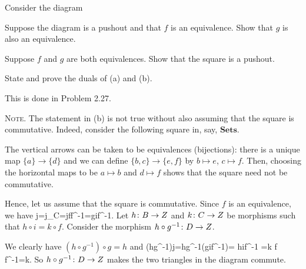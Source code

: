 \bp
Consider the diagram
\bse
{}
\ese
\ben[label=(\alph*)]
\item Suppose the diagram is a pushout and that $f$ is an equivalence. Show that $g$ is also an equivalence.
\item Suppose $f$ and $g$ are both equivalences. Show that the square is a pushout.
\item State and prove the duals of (a) and (b).
\een
\ep

\bs
\ben[label=(\alph*)]
\item This is done in Problem 2.27.
\item {\scshape Note}. The statement in (b) is not true without also assuming that the square is commutative. Indeed, consider the following square in, say, $\mathbf{Sets}$.
\bse
{}
\ese
The vertical arrows can be taken to be equivalences (bijections): there is a unique map $\{a\}\to\{d\}$ and we can define $\{b,c\}\to\{e,f\}$ by $b\mapsto e$, $c\mapsto f$. Then, choosing the horizontal maps to be $a\mapsto b$ and $d\mapsto f$ shows that the square need not be commutative.

Hence, let us assume that the square is commutative. Since $f$ is an equivalence, we have
\bse
j=j\circ \id_C=j\circ f\circ f^{-1}=g\circ i\circ f^{-1}.
\ese
Let $h\colon B\to Z$ and $k\colon C\to Z$ be morphisms such that $h\circ i=k\circ f$. Consider the morphism $h\circ g^{-1}\colon D\to Z$.
\bse
{}
\ese
We clearly have $(h\circ g^{-1})\circ g=h$ and
\bse
(h\circ g^{-1})\circ j=h\circ g^{-1}\circ (g\circ i\circ f^{-1})= h\circ i\circ f^{-1} =k \circ f \circ f^{-1}=k.
\ese
So $h\circ g^{-1}\colon D\to Z$ makes the two triangles in the diagram commute.

